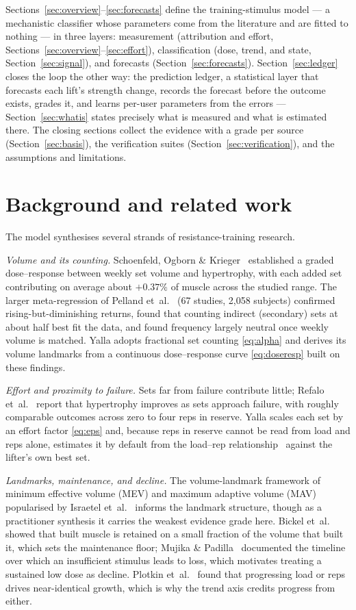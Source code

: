 \documentclass[11pt,a4paper]{article}
\begin{document}
Sections~\ref{sec:overview}--\ref{sec:forecasts} define the training-stimulus model --- a mechanistic classifier whose parameters come from the literature and are fitted to nothing --- in three layers: measurement (attribution and effort, Sections~\ref{sec:overview}--\ref{sec:effort}), classification (dose, trend, and state, Section~\ref{sec:signal}), and forecasts (Section~\ref{sec:forecasts}). Section~\ref{sec:ledger} closes the loop the other way: the prediction ledger, a statistical layer that forecasts each lift's strength change, records the forecast before the outcome exists, grades it, and learns per-user parameters from the errors --- Section~\ref{sec:whatis} states precisely what is measured and what is estimated there. The closing sections collect the evidence with a grade per source (Section~\ref{sec:basis}), the verification suites (Section~\ref{sec:verification}), and the assumptions and limitations.

\section{Background and related work}
The model synthesises several strands of resistance-training research.

\emph{Volume and its counting.} Schoenfeld, Ogborn \& Krieger~\cite{sch17} established a graded dose--response between weekly set volume and hypertrophy, with each added set contributing on average about $+0.37\%$ of muscle across the studied range. The larger meta-regression of Pelland et~al.~\cite{drr} (67 studies, 2{,}058 subjects) confirmed rising-but-diminishing returns, found that counting indirect (secondary) sets at about half best fit the data, and found frequency largely neutral once weekly volume is matched. Yalla adopts fractional set counting \eqref{eq:alpha} and derives its volume landmarks from a continuous dose--response curve \eqref{eq:doseresp} built on these findings.

\emph{Effort and proximity to failure.} Sets far from failure contribute little; Refalo et~al.~\cite{failureprox} report that hypertrophy improves as sets approach failure, with roughly comparable outcomes across zero to four reps in reserve. Yalla scales each set by an effort factor \eqref{eq:eps} and, because reps in reserve cannot be read from load and reps alone, estimates it by default from the load--rep relationship~\cite{epley} against the lifter's own best set.

\emph{Landmarks, maintenance, and decline.} The volume-landmark framework of minimum effective volume (MEV) and maximum adaptive volume (MAV) popularised by Israetel et~al.~\cite{rpvol} informs the landmark structure, though as a practitioner synthesis it carries the weakest evidence grade here. Bickel et~al.~\cite{bickel} showed that built muscle is retained on a small fraction of the volume that built it, which sets the maintenance floor; Mujika \& Padilla~\cite{mujika} documented the timeline over which an insufficient stimulus leads to loss, which motivates treating a sustained low dose as decline. Plotkin et~al.~\cite{plotkin} found that progressing load or reps drives near-identical growth, which is why the trend axis credits progress from either.
\end{document}
